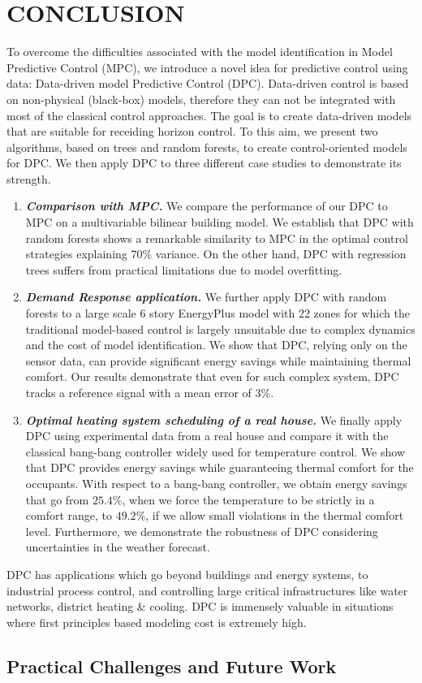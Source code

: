 \section{CONCLUSION}
\label{S:conclusion}

To overcome the difficulties associated with the model identification in Model Predictive Control (MPC), we introduce a novel idea for predictive control using data: Data-driven model Predictive Control (DPC). \textcolor[rgb]{0,0,1}{Data-driven control is based on non-physical (black-box) models, therefore they can not be integrated with most of the classical control approaches.} The goal is to create data-driven models that are suitable for receiding horizon control. \textcolor[rgb]{0,0,1}{To this aim, we present two algorithms, based on trees and random forests, to create control-oriented models for DPC. We then apply DPC to three different case studies to demonstrate its strength.}
\begin{enumerate}
\item \emph{\textbf{Comparison with MPC.}} We compare the performance of our DPC to MPC on a multivariable bilinear building model. We establish that DPC with random forests shows a remarkable similarity to MPC in the optimal control strategies explaining $70\%$ variance. On the other hand, DPC with regression trees suffers from practical limitations due to model overfitting.
\item \emph{\textbf{Demand Response application.}} We further apply DPC with random forests to a large scale 6 story EnergyPlus model with 22 zones for which the traditional model-based control is largely unsuitable due to complex dynamics and the cost of model identification. We show that DPC, relying only on the sensor data, can provide significant energy savings while maintaining thermal comfort. Our results demonstrate that even for such complex system, DPC tracks a reference signal with a mean error of $3\%$.
\item \textcolor[rgb]{0,0,1}{\emph{\textbf{Optimal heating system scheduling of a real house.}} We finally apply DPC using experimental data from a real house and compare it with the classical bang-bang controller widely used for temperature control. We show that DPC provides energy savings while guaranteeing thermal comfort for the occupants. With respect to a bang-bang controller, we obtain energy savings that go from $25.4\%$, when we force the temperature to be strictly in a comfort range, to $49.2\%$, if we allow small violations in the thermal comfort level. Furthermore, we demonstrate the robustness of DPC considering uncertainties in the weather forecast.}
\end{enumerate}

DPC has applications which go beyond buildings and energy systems, to industrial process control, and controlling large critical infrastructures like water networks, district heating \& cooling. DPC is immensely valuable in situations where first principles based modeling cost is extremely high.

\subsection{Practical Challenges and Future Work}
\label{SS:challenges}
